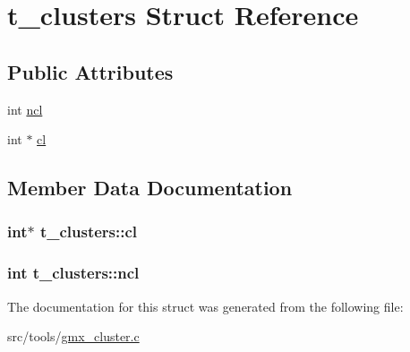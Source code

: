 \hypertarget{structt__clusters}{\section{t\-\_\-clusters \-Struct \-Reference}
\label{structt__clusters}
}
\subsection*{\-Public \-Attributes}
\begin{DoxyCompactItemize}
\item 
int \hyperlink{structt__clusters_a66edc7e5651f7ee70bd079b18f3eb6ac}{ncl}
\item 
int $\ast$ \hyperlink{structt__clusters_a22a575285525617e5f17532c9ed0bbf8}{cl}
\end{DoxyCompactItemize}


\subsection{\-Member \-Data \-Documentation}
\hypertarget{structt__clusters_a22a575285525617e5f17532c9ed0bbf8}{
\subsubsection[{cl}]{\setlength{\rightskip}{0pt plus 5cm}int$\ast$ {\bf t\-\_\-clusters\-::cl}}}\label{structt__clusters_a22a575285525617e5f17532c9ed0bbf8}
\hypertarget{structt__clusters_a66edc7e5651f7ee70bd079b18f3eb6ac}{
\subsubsection[{ncl}]{\setlength{\rightskip}{0pt plus 5cm}int {\bf t\-\_\-clusters\-::ncl}}}\label{structt__clusters_a66edc7e5651f7ee70bd079b18f3eb6ac}


\-The documentation for this struct was generated from the following file\-:\begin{DoxyCompactItemize}
\item 
src/tools/\hyperlink{gmx__cluster_8c}{gmx\-\_\-cluster.\-c}\end{DoxyCompactItemize}
